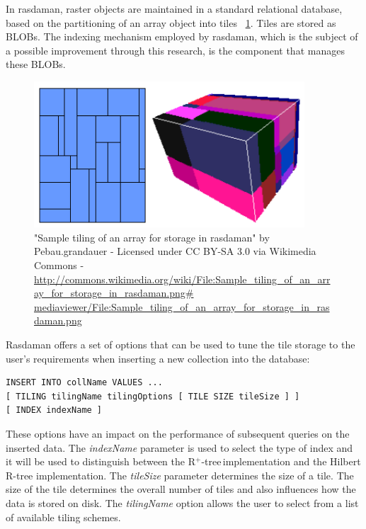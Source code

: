 \documentclass[11pt, a4paper, oneside]{article}
\newcommand{\rplus}{R$^+$-tree$\,$}
\begin{document}
In rasdaman, raster objects are maintained in a standard relational database, based on the partitioning of an array object into tiles\cite{DBLP:conf/icde/FurtadoB99} ~\ref{fig:rasdaman-tile}. Tiles are stored as BLOBs. The indexing mechanism employed by rasdaman, which is the subject of a possible improvement through this research, is the component that manages these BLOBs.

\begin{figure}[h!]
  \centering
    \includegraphics[width=0.9\textwidth]{img/tiling}
    \caption{"Sample tiling of an array for storage in rasdaman" by Pebau.grandauer - Licensed under CC BY-SA 3.0 via Wikimedia Commons -\url{http://commons.wikimedia.org/wiki/File:Sample_tiling_of_an_array_for_storage_in_rasdaman.png\# mediaviewer/File:Sample_tiling_of_an_array_for_storage_in_rasdaman.png }}
  \label{fig:rasdaman-tile}
\end{figure}

Rasdaman offers a set of options that can be used to tune the tile storage to the user's requirements when inserting a new collection into the database:

\begin{verbatim}
INSERT INTO collName VALUES ...
[ TILING tilingName tilingOptions [ TILE SIZE tileSize ] ]
[ INDEX indexName ]
\end{verbatim}

These options have an impact on the performance of subsequent queries on the inserted data. The \textit{indexName} parameter is used to select the type of index and it will be used to distinguish between the \rplus implementation and the Hilbert R-tree implementation. The \textit{tileSize} parameter determines the size of a tile. The size of the tile determines the overall number of tiles and also influences how the data is stored on disk. The \textit{tilingName} option allows the user to select from a list of available tiling schemes. 
\end{document}
